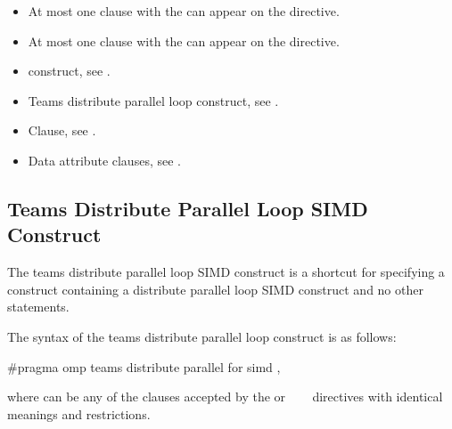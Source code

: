 {{{{\begin{itemize}
\item At most one  clause with the  
       can appear on the directive.


\item At most one  clause with the  
       can appear on the directive.
\end{itemize}

\crossreferences
\begin{itemize}
\item {} construct, see .

\item Teams distribute parallel loop construct, see
      .

\item {} Clause, see .

\item Data attribute clauses, see 
      .
\end{itemize}










\subsection{Teams Distribute Parallel Loop SIMD Construct}
\label{subsec:Teams Distribute Parallel Loop SIMD Construct}
\summary
The teams distribute parallel loop SIMD construct is a shortcut for specifying a  
construct containing a distribute parallel loop SIMD construct and no other statements.

\syntax
\ccppspecificstart
The syntax of the teams distribute parallel loop construct is as follows:

\begin{boxedcode}[fontsize=\small]
\#pragma omp teams distribute parallel for simd \plc{[clause[ [},\plc{] clause] ... ] new-line}
\end{boxedcode}

where  can be any of the clauses accepted by the  or 
~~~
directives with identical meanings and restrictions.
\ccppspecificend

}}}}
